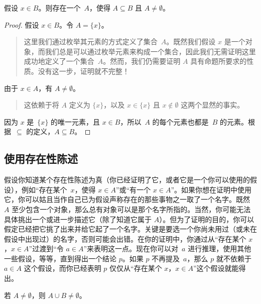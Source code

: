 \documentclass[../../../include/open-logic-section]{subfiles}
\begin{document}
\begin{prop}
  假设 $x \in B$。则存在一个~$A$，使得 $A \subseteq B$ 且 $A \neq \emptyset$。
\end{prop}

\begin{proof}
  假设 $x \in B$。令 $A = \{x\}$。
  \begin{quote}
    这里我们通过枚举其元素的方式定义了集合~$A$。既然我们假设 $x$ 是一个对象，而我们总是可以通过枚举元素来构成一个集合，因此我们无需证明这里成功地定义了一个集合~$A$。然而，我们仍需要证明 $A$ 具有命题所要求的性质。没有这一步，证明就不完整！{}
  \end{quote}
  由于 $x \in A$，有 $A \neq \emptyset$。
  \begin{quote}
    这依赖于将 $A$ 定义为 $\{x\}$，以及 $x \in \{x\}$ 且 $x \notin \emptyset$ 这两个显然的事实。
  \end{quote}
  因为 $x$ 是~$\{x\}$ 的唯一元素，且 $x \in B$，所以~$A$ 的每个元素也都是~$B$ 的元素。根据~$\subseteq$ 的定义，$A \subseteq B$。
\end{proof}

\subsection{使用存在性陈述}

假设你知道某个存在性陈述为真（你已经证明了它，或者它是一个你可以使用的假设），例如“存在某个~$x$，使得 $x \in A$”或“有一个 $x \in A$”。如果你想在证明中使用它，你可以姑且当作自己已为假设声称存在的那些事物之一取了一个名字。既然 $A$ 至少包含一个对象，那么总有对象可以是那个名字所指的。当然，你可能无法具体挑出一个或进一步描述它（除了知道它属于 $A$）。但为了证明的目的，你可以假定已经把它挑了出来并给它起了一个名字。关键是要选一个你尚未用过（或未在假设中出现过）的名字，否则可能会出错。在你的证明中，你通过从“存在某个 $x$，$x \in A$”过渡到“令 $a \in A$”来表明这一点。现在你可以对~$a$ 进行推理，使用其他一些假设，等等，直到得出一个结论 $p$。如果 $p$ 不再提及~$a$，那么 $p$ 就不依赖于 $a \in A$ 这个假设，而你已经表明 $p$ 仅仅从“存在某个 $x$，$x \in A$”这个假设就能得出。

\begin{prop}
若 $A \neq \emptyset$，则 $A \cup B \neq \emptyset$。
\end{prop}
\end{document}
